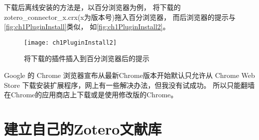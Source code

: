 \documentclass[cn,11pt,chinese]{elegantbook}
\begin{document}
	下载后离线安装的方法是，以百分浏览器为例，
	将下载的zotero\_connector\_x.crx(x为版本号)拖入百分浏览器，
	而后浏览器的提示与\autoref{fig:ch1PluginInstall}类似，
	如\autoref{fig:ch1PluginInstall2}。
	\begin{figure}[htbp]
		\centering
		\texttt{[image: ch1PluginInstall2]}
		\caption{将下载的插件插入到百分浏览器后的提示}
		\label{fig:ch1PluginInstall2}
	\end{figure}
	
	Google 的 Chrome 浏览器宣布从最新Chrome版本开始默认只允许从 Chrome Web Store 
	下载安装扩展程序，网上有一些解决办法，但我没有试成功。
	所以只能翻墙在Chrome的应用商店上下载或是使用修改版的Chrome。
	\section{建立自己的Zotero文献库}\label{sec:newLibrary}
\end{document}
